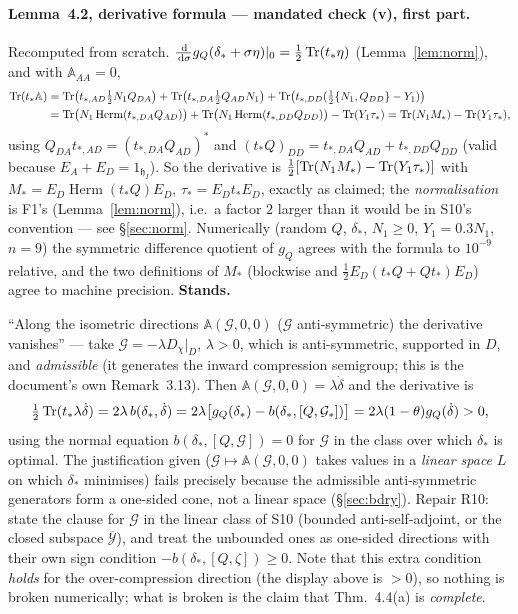 \documentclass[11pt]{article}
\newcommand{\hh}{\mathfrak h}
\newcommand{\Herm}{\operatorname{Herm}}
\newcommand{\Aop}{\mathbb A}
\begin{document}
\paragraph{Lemma~4.2, derivative formula --- mandated check (v), first part.}
Recomputed from scratch.  $\frac{\,\mathrm d}{\,\mathrm d\sigma}g_Q(\delta_*+\sigma\eta)|_0=\frac12\operatorname{Tr}(t_*\eta)$
(Lemma~\ref{lem:norm}), and with $\Aop_{AA}=0$,
\begin{align*}
 \Tr(t_*\Aop)&=\Tr\bigl(t_{*,AD}\tfrac12N_1Q_{DA}\bigr)+\Tr\bigl(t_{*,DA}\tfrac12Q_{AD}N_1\bigr)
  +\Tr\bigl(t_{*,DD}(\tfrac12\{N_1,Q_{DD}\}-Y_1)\bigr)\\
 &=\Tr\bigl(N_1\Herm(t_{*,DA}Q_{AD})\bigr)+\Tr\bigl(N_1\Herm(t_{*,DD}Q_{DD})\bigr)-\Tr(Y_1\tau_*)
  =\Tr(N_1M_*)-\Tr(Y_1\tau_*),
\end{align*}
using $Q_{DA}t_{*,AD}=(t_{*,DA}Q_{AD})^*$ and $(t_*Q)_{DD}=t_{*,DA}Q_{AD}+t_{*,DD}Q_{DD}$
(valid because $E_A+E_D=1_{\hh_I}$).  So the derivative is
$\frac12[\operatorname{Tr}(N_1M_*)-\operatorname{Tr}(Y_1\tau_*)]$ with $M_*=E_D\Herm(t_*Q)E_D$, $\tau_*=E_Dt_*E_D$,
exactly as claimed; the \emph{normalisation} is F1's (Lemma~\ref{lem:norm}), i.e.\ a factor
$2$ larger than it would be in S10's convention --- see \S\ref{sec:norm}.  Numerically
(random $Q$, $\delta_*$, $N_1\ge0$, $Y_1=0.3N_1$, $n=9$) the symmetric difference quotient
of $g_Q$ agrees with the formula to $10^{-9}$ relative, and the two definitions of $M_*$
(blockwise and $\frac12E_D(t_*Q+Qt_*)E_D$) agree to machine precision.  \textbf{Stands.}

\begin{verdictbreak}
``Along the isometric directions $\Aop(\mathcal G,0,0)$ ($\mathcal G$ anti-symmetric) the
derivative vanishes'' --- take $\mathcal G=-\lambda D_\chi|_D$, $\lambda>0$, which is
anti-symmetric, supported in $D$, and \emph{admissible} (it generates the inward
compression semigroup; this is the document's own Remark~3.13).  Then
$\Aop(\mathcal G,0,0)=\lambda\dot\delta$ and the derivative is
\[ \tfrac12\operatorname{Tr}(t_*\lambda\dot\delta)=2\lambda\,b(\delta_*,\dot\delta)
 =2\lambda\bigl[g_Q(\delta_*)-b(\delta_*,[Q,\mathcal G_*])\bigr]=2\lambda(1-\theta)g_Q(\dot\delta)>0 , \]
using the normal equation $b(\delta_*,[Q,\mathcal G])=0$ for $\mathcal G$ in the class over
which $\delta_*$ is optimal.  The justification given ($\mathcal G\mapsto\Aop(\mathcal G,0,0)$
takes values in a \emph{linear space} $L$ on which $\delta_*$ minimises) fails precisely
because the admissible anti-symmetric generators form a one-sided cone, not a linear space
(\S\ref{sec:bdry}).  Repair R10: state the clause for $\mathcal G$ in the linear class of
S10 (bounded anti-self-adjoint, or the closed subspace $\overline{\mathcal Y}$), and treat
the unbounded ones as one-sided directions with their own sign condition
$-b(\delta_*,[Q,\zeta])\ge0$.  Note that this extra condition \emph{holds} for the
over-compression direction (the display above is $>0$), so nothing is broken numerically;
what is broken is the claim that Thm.~4.4(a) is \emph{complete}.
\end{verdictbreak}
\end{document}
